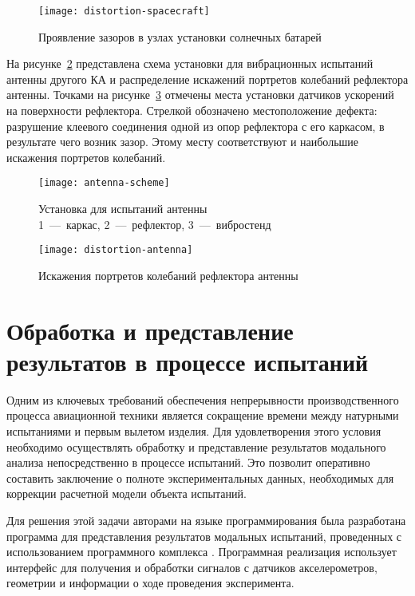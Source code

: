 \begin{figure}[!htb]
	\centerfloat
	\texttt{[image: distortion-spacecraft]}
	\caption{Проявление зазоров в узлах установки солнечных батарей} \label{fig:distortion-spacecraft}
\end{figure}

На рисунке~\ref{fig:antenna-scheme} представлена схема установки для вибрационных испытаний антенны другого КА и распределение искажений портретов колебаний рефлектора антенны. Точками на рисунке~\ref{fig:distortion-antenna} отмечены места установки датчиков ускорений на поверхности рефлектора. Стрелкой обозначено местоположение дефекта: разрушение клеевого соединения одной из опор рефлектора с его каркасом, в результате чего возник зазор. Этому месту соответствуют и наибольшие искажения портретов колебаний.

\begin{figure}[H]
	\centerfloat
	\texttt{[image: antenna-scheme]}
	\caption{Установка для испытаний антенны \\ 1~---~каркас, 2~---~рефлектор, 3~---~вибростенд} \label{fig:antenna-scheme}
\end{figure}

\begin{figure}[!htb]
	\centerfloat
	\texttt{[image: distortion-antenna]}
	\caption{Искажения портретов колебаний рефлектора антенны} \label{fig:distortion-antenna}
\end{figure}

\section{Обработка и представление результатов в процессе испытаний}

Одним из ключевых требований обеспечения непрерывности производственного процесса авиационной техники является сокращение времени между натурными испытаниями и первым вылетом изделия. Для удовлетворения этого условия необходимо осуществлять обработку и представление результатов модального анализа непосредственно в процессе испытаний. Это позволит оперативно составить заключение о полноте экспериментальных данных, необходимых для коррекции расчетной модели объекта испытаний. 

Для решения этой задачи авторами на языке программирования  была разработана программа  для представления результатов модальных испытаний, проведенных с использованием программного комплекса . Программная реализация использует интерфейс  для получения и обработки сигналов с датчиков акселерометров, геометрии и информации о ходе проведения эксперимента.

